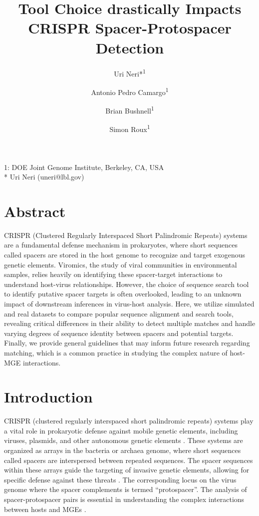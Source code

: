 \documentclass[
]{article}
\title{Tool Choice drastically Impacts CRISPR Spacer-Protospacer
Detection}
\author{Uri Neri*\textsuperscript{1} \and Antonio Pedro
Camargo\textsuperscript{1} \and Brian
Bushnell\textsuperscript{1} \and Simon Roux\textsuperscript{1}}
\date{}
\begin{document}
\maketitle


1: DOE Joint Genome Institute, Berkeley, CA, USA\\
* Uri Neri (uneri@lbl.gov)

\section{Abstract}\label{sec-abstract}

CRISPR (Clustered Regularly Interspaced Short Palindromic Repeats)
systems are a fundamental defense mechanism in prokaryotes, where short
sequences called spacers are stored in the host genome to recognize and
target exogenous genetic elements. Viromics, the study of viral
communities in environmental samples, relies heavily on identifying
these spacer-target interactions to understand host-virus relationships.
However, the choice of sequence search tool to identify putative spacer
targets is often overlooked, leading to an unknown impact of downstream
inferences in virus-host analysis. Here, we utilize simulated and real
datasets to compare popular sequence alignment and search tools,
revealing critical differences in their ability to detect multiple
matches and handle varying degrees of sequence identity between spacers
and potential targets. Finally, we provide general guidelines that may
inform future research regarding matching, which is a common practice in
studying the complex nature of host-MGE interactions.

\section{Introduction}\label{sec-introduction}

CRISPR (clustered regularly interspaced short palindromic repeats)
systems play a vital role in prokaryotic defense against mobile genetic
elements, including viruses, plasmids, and other autonomous genetic
elements \autocite{Mojica_2005,CRISPR_review}. These systems are
organized as arrays in the bacteria or archaea genome, where short
sequences called spacers are interspersed between repeated sequences.
The spacer sequences within these arrays guide the targeting of invasive
genetic elements, allowing for specific defense against these threats
\autocite{CRISPR_classification}. The corresponding locus on the virus
genome where the spacer complements is termed ``protospacer''. The
analysis of spacer-protospacer pairs is essential in understanding the
complex interactions between hosts and MGEs
\autocite{Edwards2015_phage_host}.
\end{document}
